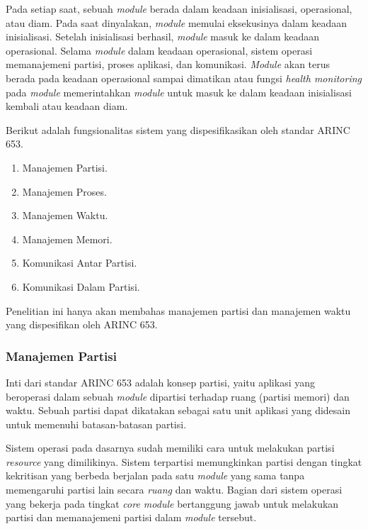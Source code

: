 Pada setiap saat, sebuah \textit{module} berada dalam keadaan inisialisasi, operasional, atau
diam.  Pada saat dinyalakan, \textit{module} memulai eksekusinya dalam keadaan inisialisasi.
Setelah inisialisasi berhasil, \textit{module} masuk ke dalam keadaan operasional.  Selama
\textit{module} dalam keadaan operasional, sistem operasi memanajemeni partisi, proses aplikasi,
dan komunikasi.  \textit{Module} akan terus berada pada keadaan operasional sampai dimatikan
atau fungsi \textit{health monitoring} pada \textit{module} memerintahkan \textit{module} untuk
masuk ke dalam keadaan inisialisasi kembali atau keadaan diam.

Berikut adalah fungsionalitas sistem yang dispesifikasikan oleh standar ARINC 653.

\begin{enumerate}

    \item Manajemen Partisi.

    \item Manajemen Proses.

    \item Manajemen Waktu.

    \item Manajemen Memori.

    \item Komunikasi Antar Partisi.

    \item Komunikasi Dalam Partisi.

\end{enumerate}

Penelitian ini hanya akan membahas manajemen partisi dan manajemen waktu yang dispesifikan oleh
ARINC 653.

\subsubsection[Manajemen Partisi]{Manajemen Partisi}

Inti dari standar ARINC 653 adalah konsep partisi, yaitu aplikasi yang beroperasi dalam sebuah
\textit{module} dipartisi terhadap ruang (partisi memori) dan waktu. Sebuah partisi dapat
dikatakan sebagai satu unit aplikasi yang didesain untuk memenuhi batasan-batasan partisi.

Sistem operasi pada dasarnya sudah memiliki cara untuk melakukan partisi \textit{resource} yang
dimilikinya.  Sistem terpartisi memungkinkan partisi dengan tingkat kekritisan yang berbeda
berjalan pada satu \textit{module} yang sama tanpa memengaruhi partisi lain secara
\textit{ruang} dan waktu.  Bagian dari sistem operasi yang bekerja pada tingkat \textit{core
module} bertanggung jawab untuk melakukan partisi dan memanajemeni partisi dalam \textit{module}
tersebut.

